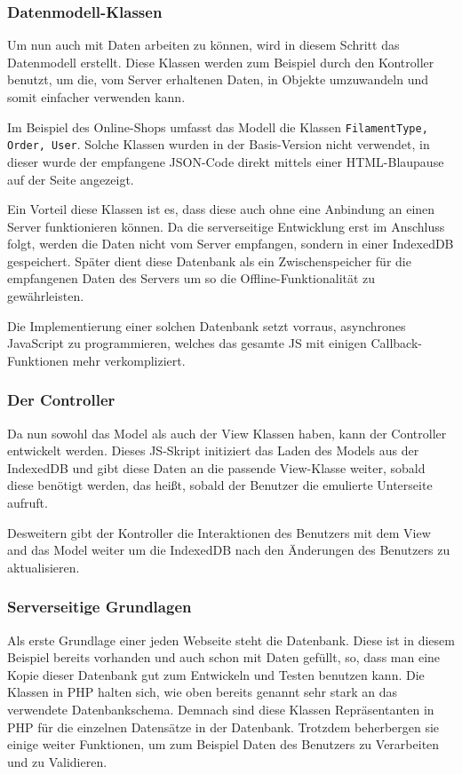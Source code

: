 \documentclass[a4paper,12pt,ngerman,listof=numbered]{scrartcl}      %
\providecommand{\inlinecode}[1]{\texttt{#1}}
\begin{document}
	\subsubsection{Datenmodell-Klassen}
	Um nun auch mit Daten arbeiten zu können, wird in diesem Schritt das Datenmodell erstellt. Diese Klassen werden zum Beispiel durch den Kontroller benutzt, um die, vom Server erhaltenen Daten, in Objekte umzuwandeln und somit einfacher verwenden kann.\par
	Im Beispiel des Online-Shops umfasst das Modell die Klassen \inlinecode{FilamentType, Order, User}. Solche Klassen wurden in der Basis-Version nicht verwendet, in dieser wurde der empfangene JSON-Code direkt mittels einer HTML-Blaupause auf der Seite angezeigt.\par
	Ein Vorteil diese Klassen ist es, dass diese auch ohne eine Anbindung an einen Server funktionieren können. Da die serverseitige Entwicklung erst im Anschluss folgt, werden die Daten nicht vom Server empfangen, sondern in einer IndexedDB gespeichert. Später dient diese Datenbank als ein Zwischenspeicher für die empfangenen Daten des Servers um so die Offline-Funktionalität zu gewährleisten.\par
	Die Implementierung einer solchen Datenbank setzt vorraus, asynchrones Java\-Script zu programmieren, welches das gesamte JS mit einigen Call\-back-Funk\-ti\-onen mehr verkompliziert.\par
	
	\subsubsection{Der Controller}
	Da nun sowohl das Model als auch der View Klassen haben, kann der Controller entwickelt werden. Dieses JS-Skript initiziert das Laden des Models aus der IndexedDB und gibt diese Daten an die passende View-Klasse weiter, sobald diese benötigt werden, das heißt, sobald der Benutzer die emulierte Unterseite aufruft.\par
	Desweitern gibt der Kontroller die Interaktionen des Benutzers mit dem View and das Model weiter um die IndexedDB nach den Änderungen des Benutzers zu aktualisieren.\par
	
	\subsubsection{Serverseitige Grundlagen}
	Als erste Grundlage einer jeden Webseite steht die Datenbank. Diese ist in diesem Beispiel bereits vorhanden und auch schon mit Daten gefüllt, so, dass man eine Kopie dieser Datenbank gut zum Entwickeln und Testen benutzen kann. Die Klassen in PHP halten sich, wie oben bereits genannt sehr stark an das verwendete Datenbankschema. Demnach sind diese Klassen Repräsentanten in PHP für die einzelnen Datensätze in der Datenbank. Trotzdem beherbergen sie einige weiter Funktionen, um zum Beispiel Daten des Benutzers zu Verarbeiten und zu Validieren.\par
	
\end{document}
